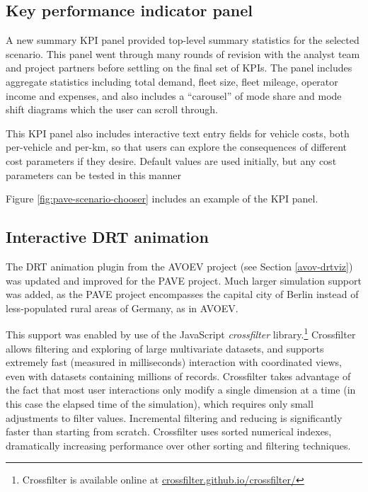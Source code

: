 \subsection{Key performance indicator panel}
\label{pave-kpi-panel}

A new summary \gls{KPI} panel provided top-level summary statistics for the selected scenario. This panel went through many rounds of revision with the analyst team and project partners before settling on the final set of KPIs. The panel includes aggregate statistics including total demand, fleet size, fleet mileage, operator income and expenses, and also includes a ``carousel'' of mode share and mode shift diagrams which the user can scroll through.

This KPI panel also includes interactive text entry fields for vehicle costs, both per-vehicle and per-km, so that users can explore the consequences of different cost parameters if they desire. Default values are used initially, but any cost parameters can be tested in this manner

Figure \ref{fig:pave-scenario-chooser} includes an example of the KPI panel.

\subsection{Interactive DRT animation}
\label{pave-drt-animation}

The DRT animation plugin from the AVOEV project (see Section \ref{avov-drtviz}) was updated and improved for the PAVE project. Much larger simulation support was added, as the PAVE project encompasses the capital city of Berlin instead of less-populated rural areas of Germany, as in AVOEV.

This support was enabled by use of the JavaScript \emph{crossfilter} library.\footnote{Crossfilter is available online at \href{https://crossfilter.github.io/crossfilter/}{crossfilter.github.io/crossfilter/}} Crossfilter allows filtering and exploring of large multivariate datasets, and supports extremely fast (measured in milliseconds) interaction with coordinated views, even with datasets containing millions of records. Crossfilter takes advantage of the fact that most user interactions only modify a single dimension at a time (in this case the elapsed time of the simulation), which requires only small adjustments to filter values. Incremental filtering and reducing is significantly faster than starting from scratch. Crossfilter uses sorted numerical indexes, dramatically increasing perfor­mance over other sorting and filtering techniques.

